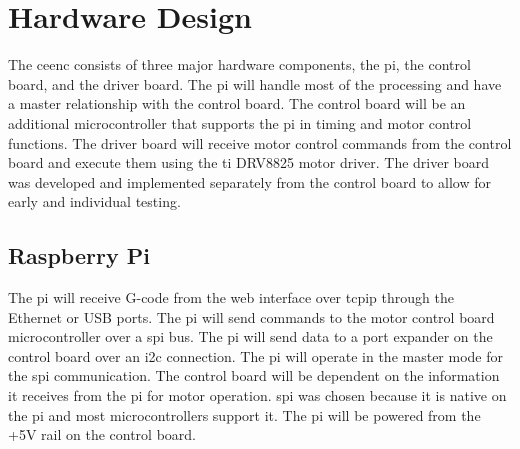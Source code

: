 \newpage
\section{Hardware Design}
The \gls{ceenc} consists of three major hardware components, the \gls{pi}, the control board, and the driver board.
The \gls{pi} will handle most of the processing and have a master relationship with the control board.
The control board will be an additional microcontroller that supports the \gls{pi} in timing and motor control functions.
The driver board will receive motor control commands from the control board and execute them using the \gls{ti} DRV8825 motor driver.
The driver board was developed and implemented separately from the control board to allow for early and individual testing.

\subsection{Raspberry Pi}
The \gls{pi} will receive G-code from the web interface over \gls{tcpip} through the Ethernet or USB ports.
The \gls{pi} will send commands to the motor control board microcontroller over a \gls{spi} bus.
The \gls{pi} will send data to a port expander on the control board over an \gls{i2c} connection.
The \gls{pi} will operate in the master mode for the \gls{spi} communication.
The control board will be dependent on the information it receives from the \gls{pi} for motor operation.
\gls{spi} was chosen because it is native on the \gls{pi} and most microcontrollers support it.
The \gls{pi} will be powered from the +5V rail on the control board.

